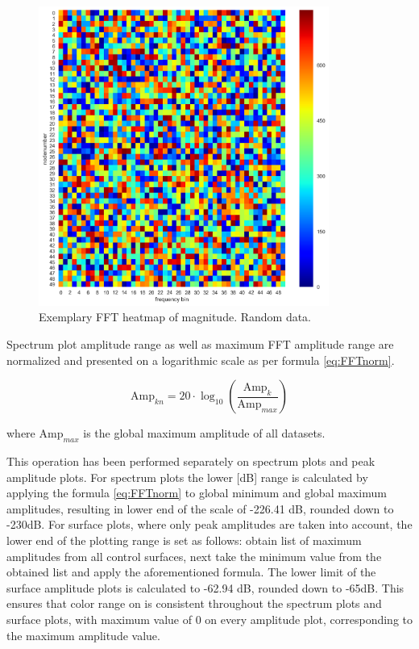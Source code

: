 \begin{figure}[h!]
\centering %
\includegraphics[width=0.85\textwidth]{Pictures/fft_heat.png}
\caption{Exemplary FFT heatmap of magnitude. Random data.}
\label{fft_heat}
\end{figure}

Spectrum plot amplitude range as well as maximum FFT amplitude range are normalized and presented on a logarithmic scale as per formula \ref{eq:FFTnorm}. 

\begin{equation} \label{eq:FFTnorm}
\text{Amp}_{kn} = 20 \cdot \log_{10} \left( \frac{\text{Amp}_{k}}{\text{Amp}_{max}} \right)
\end{equation}

\noindent where $\text{Amp}_{max}$ is the global maximum amplitude of all datasets.

This operation has been performed separately on spectrum plots and peak amplitude plots. For spectrum plots the lower [dB] range is calculated by applying the formula \ref{eq:FFTnorm} to global minimum and global maximum amplitudes, resulting in lower end of the scale of -226.41 dB, rounded down to -230dB. For surface plots, where only peak amplitudes are taken into account, the lower end of the plotting range is set as follows: obtain list of maximum amplitudes from all control surfaces, next take the minimum value from the obtained list and apply the aforementioned formula. The lower limit of the surface amplitude plots is calculated to -62.94 dB, rounded down to -65dB. This ensures that color range on is consistent throughout the spectrum plots and surface plots, with maximum value of 0 on every amplitude plot, corresponding to the maximum amplitude value.

